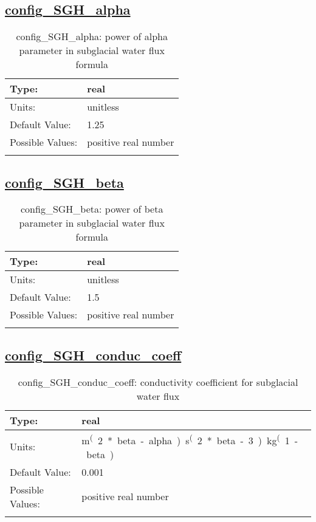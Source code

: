 \subsection[config\_SGH\_alpha]{\hyperref[sec:nm_tab_subglacial_hydro]{config\_SGH\_alpha}}
\label{subsec:nm_sec_config_SGH_alpha}
\begin{center}
\begin{longtable}{| p{2.0in} || p{4.0in} |}
    \hline
    Type: & real \\
    \hline
    Units: & \si{unitless} \\
    \hline
    Default Value: & 1.25 \\
    \hline
    Possible Values: & positive real number \\
    \hline
    \caption{config\_SGH\_alpha: power of alpha parameter in subglacial water flux formula}
\end{longtable}
\end{center}
\subsection[config\_SGH\_beta]{\hyperref[sec:nm_tab_subglacial_hydro]{config\_SGH\_beta}}
\label{subsec:nm_sec_config_SGH_beta}
\begin{center}
\begin{longtable}{| p{2.0in} || p{4.0in} |}
    \hline
    Type: & real \\
    \hline
    Units: & \si{unitless} \\
    \hline
    Default Value: & 1.5 \\
    \hline
    Possible Values: & positive real number \\
    \hline
    \caption{config\_SGH\_beta: power of beta parameter in subglacial water flux formula}
\end{longtable}
\end{center}
\subsection[config\_SGH\_conduc\_coeff]{\hyperref[sec:nm_tab_subglacial_hydro]{config\_SGH\_conduc\_coeff}}
\label{subsec:nm_sec_config_SGH_conduc_coeff}
\begin{center}
\begin{longtable}{| p{2.0in} || p{4.0in} |}
    \hline
    Type: & real \\
    \hline
    Units: & \si{m^(2*beta-alpha).s^(2*beta-3).kg^(1-beta)} \\
    \hline
    Default Value: & 0.001 \\
    \hline
    Possible Values: & positive real number \\
    \hline
    \caption{config\_SGH\_conduc\_coeff: conductivity coefficient for subglacial water flux}
\end{longtable}
\end{center}
